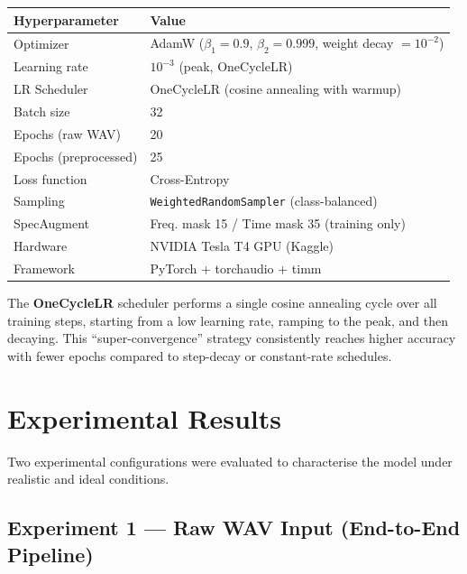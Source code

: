 \documentclass[12pt,a4paper]{article}
\begin{document}
\begin{center}
\renewcommand{\arraystretch}{1.3}
\begin{tabular}{ll}
  \toprule
  \textbf{Hyperparameter} & \textbf{Value} \\
  \midrule
  Optimizer         & AdamW ($\beta_1=0.9$, $\beta_2=0.999$, weight decay $= 10^{-2}$) \\
  Learning rate     & $10^{-3}$ (peak, OneCycleLR) \\
  LR Scheduler      & OneCycleLR (cosine annealing with warmup) \\
  Batch size        & 32 \\
  Epochs (raw WAV)  & 20 \\
  Epochs (preprocessed) & 25 \\
  Loss function     & Cross-Entropy \\
  Sampling          & \texttt{WeightedRandomSampler} (class-balanced) \\
  SpecAugment       & Freq. mask 15 / Time mask 35 (training only) \\
  Hardware          & NVIDIA Tesla T4 GPU (Kaggle) \\
  Framework         & PyTorch + torchaudio + timm \\
  \bottomrule
\end{tabular}
\end{center}

The \textbf{OneCycleLR} scheduler performs a single cosine annealing cycle over all training steps, starting from a low learning rate, ramping to the peak, and then decaying. This ``super-convergence'' strategy consistently reaches higher accuracy with fewer epochs compared to step-decay or constant-rate schedules.

\section{Experimental Results}

Two experimental configurations were evaluated to characterise the model under realistic and ideal conditions.

\subsection{Experiment 1 — Raw WAV Input (End-to-End Pipeline)}
\end{document}
